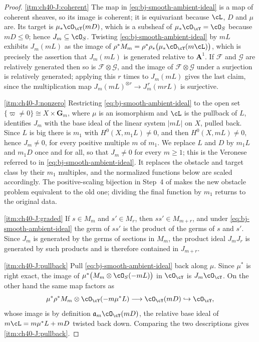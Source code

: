 \begin{proof}
\cref{itm:ch40-J:coherent}  The map in \eqref{eq:bj-smooth-ambient-ideal} is
a map of coherent sheaves, so its image is coherent; it is equivariant
because $\cL$, $D$ and $\mu$ are.  Its target is
$\mu_*\cO_{\cY}(mD)$, which is a subsheaf of
$\mu_*\cO_{\cY}=\cO_S$ because $mD\le0$; hence $J_m\subseteq\cO_S$.
Twisting \eqref{eq:bj-smooth-ambient-ideal} by $mL$ exhibits
$J_m(mL)$ as the image of $\rho^*M_m=\rho^*\rho_*\bigl(\mu_*\cO_{\cY}(m\cL)\bigr)$,
which is precisely the assertion that $J_m(mL)$ is generated relative to
$\mathbf A^1$.  If $\mathcal F$ and $\mathcal G$ are relatively
generated then so is $\mathcal F\otimes\mathcal G$, and the image of
$\mathcal F\otimes\mathcal G$ under a surjection is relatively generated;
applying this $r$ times to $J_m(mL)$ gives the last claim, since the
multiplication map $J_m(mL)^{\otimes r}\to J_m^{\,r}(mrL)$ is surjective.

\cref{itm:ch40-J:nonzero}  Restricting \eqref{eq:bj-smooth-ambient-ideal} to
the open set $\{\varpi\ne0\}\cong X\times\mathbf G_m$, where $\mu$ is an
isomorphism and $\cL$ is the pullback of $L$, identifies $J_m$ with the
base ideal of the linear system $|mL|$ on $X$, pulled back.  Since $L$
is big there is $m_1$ with $H^0(X,m_1L)\ne0$, and then
$H^0(X,mL)\ne0$, hence $J_m\ne0$, for every positive multiple $m$ of
$m_1$.  We replace $L$ and $D$ by $m_1L$ and $m_1D$ once and for
all, so that $J_m\ne0$ for every $m\ge1$; this is the Veronese referred
to in \eqref{eq:bj-smooth-ambient-ideal}.  It replaces the obstacle and
target class by their $m_1$ multiples, and the normalized functions below
are scaled accordingly.  The positive-scaling bijection in Step~4 of
 makes the new obstacle problem
equivalent to the old one; dividing the final function by $m_1$ returns
to the original data.

\cref{itm:ch40-J:graded}  If $s\in M_m$ and $s'\in M_r$, then
$ss'\in M_{m+r}$, and under \eqref{eq:bj-smooth-ambient-ideal} the germ of
$ss'$ is the product of the germs of $s$ and $s'$.  Since $J_m$ is
generated by the germs of sections in $M_m$, the product ideal
$J_mJ_r$ is generated by such products and is therefore contained in
$J_{m+r}$.

\cref{itm:ch40-J:pullback}  Pull \eqref{eq:bj-smooth-ambient-ideal} back
along $\mu$.  Since $\mu^*$ is right exact, the image of
$\mu^*\bigl(M_m\otimes\cO_S(-mL)\bigr)$ in $\cO_{\cY}$ is
$J_m\cO_{\cY}$.  On the other hand the same map factors as
\[
 \mu^*\rho^*M_m\otimes\cO_{\cY}(-m\mu^*L)
 \longrightarrow\cO_{\cY}(mD)
 \hookrightarrow\cO_{\cY},
\]
whose image is by definition $\mathfrak a_m\cO_{\cY}(mD)$, the relative
base ideal of $m\cL=m\mu^*L+mD$ twisted back down.  Comparing the two
descriptions gives \cref{itm:ch40-J:pullback}.
\end{proof}

